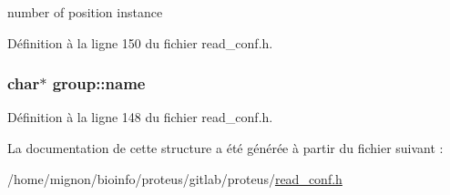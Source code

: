 number of position instance 



Définition à la ligne 150 du fichier read\+\_\+conf.\+h.

\hypertarget{structgroup_a55a316cced9c73cc1778aa4554c383cc}{
\subsubsection[{name}]{\setlength{\rightskip}{0pt plus 5cm}char$\ast$ group\+::name}}\label{structgroup_a55a316cced9c73cc1778aa4554c383cc}


Définition à la ligne 148 du fichier read\+\_\+conf.\+h.



La documentation de cette structure a été générée à partir du fichier suivant \+:\begin{DoxyCompactItemize}
\item 
/home/mignon/bioinfo/proteus/gitlab/proteus/\hyperlink{read__conf_8h}{read\+\_\+conf.\+h}\end{DoxyCompactItemize}
